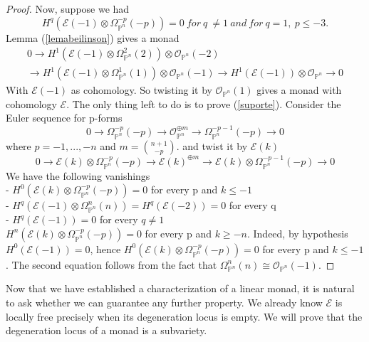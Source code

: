 \documentclass[
	oldfontcommands,
	sumario=abnt-6027-2012,
	12pt,			%
	openright,		%
	oneside,		%
	a4paper,		%
	english,		%
	brazil			%
	]{imecc-unicamp}
\begin{document}
\begin{proof}
Now, suppose we had 
\begin{equation}\label{suporte}
H^q(\mathcal{E}(-1) \otimes \Omega^{-p}_{\mathbb{P}^n}(-p))=0 \ for \ q \ \not= 1 \ and \ for \ q=1, \ p\leq -3. 
\end{equation}
Lemma (\ref{lemabeilinson}) gives a monad
\begin{multline*}
0 \to H^1(\mathcal{E}(-1) \otimes \Omega^{2}_{\mathbb{P}^n}(2)) \otimes \mathcal{O}_{\mathbb{P}^n}(-2) \\ \to H^1(\mathcal{E}(-1) \otimes \Omega^{1}_{\mathbb{P}^n}(1)) \otimes \mathcal{O}_{\mathbb{P}^n}(-1) \to H^1(\mathcal{E}(-1)) \otimes \mathcal{O}_{\mathbb{P}^n} \to 0
\end{multline*}
With $\mathcal{E}(-1)$ as cohomology. So twisting it by $\mathcal{O}_{\mathbb{P}^n}(1)$ gives a monad with cohomology $\mathcal{E}$.
The only thing left to do is to prove (\ref{suporte}).
Consider the Euler sequence for p-forms 
\begin{equation}
0 \to  \Omega^{-p}_{\mathbb{P}^n}(-p) \to \mathcal{O}_{\mathbb{P}^n} ^{\oplus m} \to  \Omega^{-p-1}_{\mathbb{P}^n}(-p) \to 0
\end{equation}
where  $p=-1,...,-n$ and $m= {n+1\choose -p}$. and twist it by $\mathcal{E}(k)$
\begin{equation}
0 \to \mathcal{E}(k) \otimes \Omega^{-p}_{\mathbb{P}^n}(-p) \to \mathcal{E}(k) ^{\oplus m} \to \mathcal{E}(k) \otimes  \Omega^{-p-1}_{\mathbb{P}^n}(-p) \to 0
\end{equation}
We have the following vanishings \\
- $H^0( \mathcal{E}(k) \otimes \Omega^{-p}_{\mathbb{P}^n}(-p) )=0$ for every p and $k \leq -1$ \\
- $H^q(\mathcal{E}(-1) \otimes \Omega^{n}_{\mathbb{P}^n}(n))=H^q(\mathcal{E}(-2))=0$ for every q\\
- $H^q(\mathcal{E}(-1))=0$ for every $q\not=1$\\
$H^n(\mathcal{E}(k) \otimes \Omega^{-p}_{\mathbb{P}^n}(-p)) =0$ for every p and $k \geq -n$. Indeed, by hypothesis $H^0(\mathcal{E}(-1))=0$, hence $H^0( \mathcal{E}(k) \otimes \Omega^{-p}_{\mathbb{P}^n}(-p) )=0$ for every p and $k \leq -1$. The second equation follows from the fact that $\Omega^{n}_{\mathbb{P}^n}(n)\cong\mathcal{O}_{\mathbb{P}^n}(-1)$. 
\end{proof}
Now that we have established a characterization of a linear monad, it is natural to ask whether we can guarantee any further property. We already know $\mathcal{E}$ is locally free precisely when its degeneration locus is empty. 
We will prove that the degeneration locus of a monad is a subvariety. %
\end{document}
